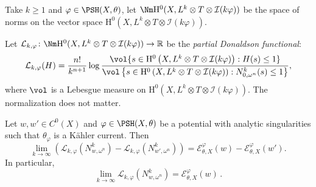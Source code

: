 \begin{definition}\label{def:Bergman:L942}
    Take $k\geq 1$ and $\varphi\in \PSH(X,\theta)$, let $\Nm \mathrm{H}^0(X,L^k \otimes T \otimes \mathcal{I}(k\varphi))$ be the space of norms on the vector space $\mathrm{H}^0(X,L^k \otimes T \otimes \mathcal{I}(k\varphi))$.

    Let $\mathcal{L}_{k,\varphi} \colon \Nm \mathrm{H}^0(X,L^k \otimes T \otimes \mathcal{I}(k\varphi)) \to \mathbb R$ be the \emph{partial Donaldson functional}:
\begin{equation}
\mathcal{L}_{k,\varphi}(H) = \frac{n!}{k^{n+1}} \log \frac{\vol\{s \in \mathrm{H}^0\left(X,L^k \otimes T \otimes \mathcal{I}(k\varphi)\right) : H(s) \leq 1\}}{\vol \left\{s\in \mathrm{H}^0\left(X,L^k \otimes T \otimes \mathcal{I}(k\varphi)\right) : N^k_{0,\omega^n}(s) \leq 1\right\}},
\end{equation}
where $\vol$ is a Lebesgue measure on $\mathrm{H}^0(X,L^k \otimes T \otimes \mathcal{I}(k\varphi))$. The normalization does not matter.
\end{definition}

\begin{proposition}\label{prop:quant_I_smooth}
Let $w,w' \in C^0(X)$ and $\varphi \in \PSH(X,\theta)$ be a potential with analytic singularities such that $\theta_{\varphi}$ is a Kähler current. Then
\begin{equation}\label{eq:LdiffonXsmoothmeasure}
\lim_{k\to\infty} \left(\mathcal{L}_{k,\varphi}(N^k_{w,\omega^n}) - \mathcal{L}_{k,\varphi}(N^k_{w',\omega^n}) \right)= \mathcal{E}_{\theta,X}^{\varphi}(w)-\mathcal{E}_{\theta,X}^{\varphi}(w').
\end{equation}
In particular,
\begin{equation}\label{eq:LdiffonXsmoothmeasure2}
\lim_{k\to\infty}\mathcal{L}_{k,\varphi}(N^k_{w,\omega^n})=\mathcal{E}_{\theta,X}^{\varphi}(w)\,.
\end{equation}
\end{proposition}


